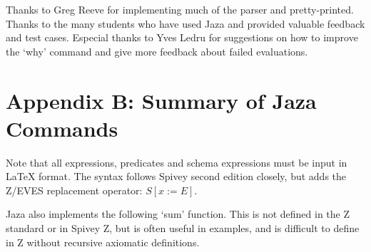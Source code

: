 \documentclass[11pt]{article}
\newcommand{\Jaza}{Jaza}
\begin{document}
Thanks to Greg Reeve for implementing much of the parser and
pretty-printed.  Thanks to the many students who have used Jaza
and provided valuable feedback and test cases.  Especial thanks
to Yves Ledru for suggestions on how to improve the `why' command
and give more feedback about failed evaluations.




\appendix

\section*{Appendix B: Summary of {\Jaza} Commands}

Note that all expressions, predicates and schema expressions
must be input in {\LaTeX} format.  The syntax follows Spivey
second edition closely, but adds the Z/EVES replacement
operator: $S[x := E]$.  

Jaza also implements the following `sum' function.  This is not defined in the Z
standard or in Spivey Z, but is often useful in examples, and is difficult to
define in Z without recursive axiomatic definitions.
\end{document}
